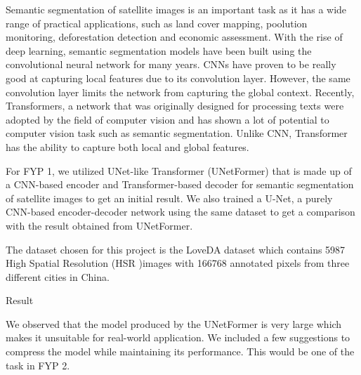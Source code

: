 
Semantic segmentation of satellite images is an important task as it has a wide range of practical applications, such as land cover mapping, poolution monitoring, deforestation detection and economic assessment. With the rise of deep learning, semantic segmentation models have been built using the convolutional neural network for many years. CNNs have proven to be really good at capturing local features due to its convolution layer. However, the same convolution layer limits the network from capturing the global context. Recently, Transformers, a network that was originally designed for processing texts were adopted by the field of computer vision and has shown a lot of potential to computer vision task such as semantic segmentation. Unlike CNN, Transformer has the ability to capture both local and global features.

For FYP 1, we utilized UNet-like Transformer (UNetFormer) that is made up of a CNN-based encoder and Transformer-based decoder for semantic segmentation of satellite images to get an initial result. We also trained a U-Net, a purely CNN-based encoder-decoder network using the same dataset to get a comparison with the result obtained from UNetFormer.

The dataset chosen for this project is the LoveDA dataset which contains 5987 High Spatial Resolution (HSR )images with 166768 annotated pixels from three different cities in China.

Result

We observed that the model produced by the UNetFormer is very large which makes it unsuitable for real-world application. We included a few suggestions to compress the model while maintaining its performance. This would be one of the task in FYP 2.
